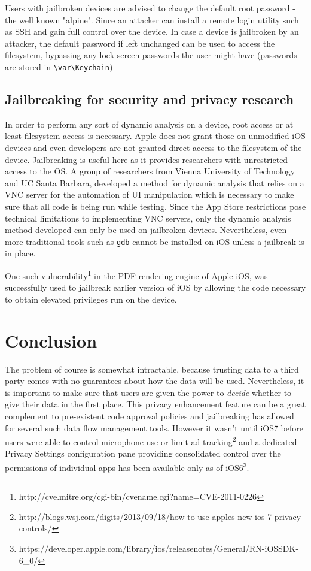 \documentclass[12pt, titlepage, oneside]{article}
\begin{document}
Users with jailbroken devices are advised to change the default root password - the well known "alpine". Since an attacker can install a remote login utility such as SSH and gain full control over the device. In case a device is jailbroken by an attacker, the default password if left unchanged can be used to access the filesystem, bypassing any lock screen passwords the user might have (passwords are stored in \texttt{{\textbackslash}var{\textbackslash}Keychain})\cite{lostpass}

\subsection{Jailbreaking for security and privacy research}
In order to perform any sort of dynamic analysis on a device, root access or at least filesystem access is necessary. Apple does not grant those on unmodified iOS devices and even developers are not granted direct access to the filesystem of the device. Jailbreaking is useful here as it provides researchers with unrestricted access to the OS. 
A group of researchers from Vienna University of Technology and UC Santa Barbara\cite{dynamic}, developed a method for dynamic analysis that relies on a VNC server for the automation of UI manipulation which is necessary to make sure that all code is being run while testing. Since the App Store restrictions pose technical limitations to implementing VNC servers, only the dynamic analysis method developed can only be used on jailbroken devices. Nevertheless, even more traditional tools such as \texttt{gdb} cannot be installed on iOS unless a jailbreak is in place.



One such vulnerability\footnote{http://cve.mitre.org/cgi-bin/cvename.cgi?name=CVE-2011-0226} in the PDF rendering engine of Apple iOS\cite{pios}, was successfully used to jailbreak earlier version of iOS by allowing the code necessary to obtain elevated privileges run on the device. 


\section{Conclusion}
The problem of course is somewhat intractable, because trusting data to a third party comes with no guarantees about how the data will be used. Nevertheless, it is important to make sure that users are given the power to \emph{decide} whether to give their data in the first place. This privacy enhancement feature can be a great complement to pre-existent code approval policies and jailbreaking has allowed for several such data flow management tools. However it wasn't until iOS7 before users were able to control microphone use or limit ad tracking\footnote{http://blogs.wsj.com/digits/2013/09/18/how-to-use-apples-new-ios-7-privacy-controls/} and a dedicated Privacy Settings configuration pane providing consolidated control over the permissions of individual apps has been available only as of iOS6\footnote{https://developer.apple.com/library/ios/releasenotes/General/RN-iOSSDK-6\_0/}. 


\nocite{*} 




\end{document}
